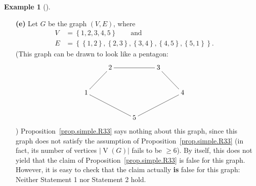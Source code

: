 \documentclass[numbers=enddot,12pt,final,onecolumn,notitlepage]{scrartcl}%
\makeatletter
\theoremstyle{definition}
\newtheorem{exam}[theo]{Example}
\newenvironment{example}[1][]
{\begin{exam}[#1]\begin{leftbar}}
{\end{leftbar}\end{exam}}
\newcommand{\set}[1]{\left\{ #1 \right\}}
\newcommand{\abs}[1]{\left| #1 \right|}
\newcommand{\tup}[1]{\left( #1 \right)}
\newcommand{\verts}[1]{\operatorname{V}\left( #1 \right)}
\newcommand{\are}{\ar@{-}}
\makeatother
\begin{document}
\begin{example}
\begin{enumerate}
\item[\textbf{(e)}] Let $G$ be the graph $\tup{V, E}$, where
\begin{align*}
V &= \set{1, 2, 3, 4, 5} \qquad \text{and} \\
E &= \set{\set{1,2}, \set{2,3}, \set{3,4}, \set{4,5}, \set{5,1}} .
\end{align*}
(This graph can be drawn to look like a pentagon:
\begin{align*}
\xymatrix{
& 2 \are[rr] & & 3 \are[rd] \\
1 \are[ru] \are[rrd] & & & & 4 \are[lld] \\
& & 5
}
\end{align*}
)
Proposition~\ref{prop.simple.R33} says nothing about this graph,
since this graph does not satisfy the assumption of
Proposition~\ref{prop.simple.R33} (in fact, its number of vertices
$\abs{\verts{G}}$ fails to be $\geq 6$).
By itself, this does not yield that the claim of
Proposition~\ref{prop.simple.R33} is false for this graph. However,
it is easy to check that the claim actually \textbf{is} false for this
graph: Neither Statement 1 nor Statement 2 hold.
\end{enumerate}

\end{example}
\end{document}
